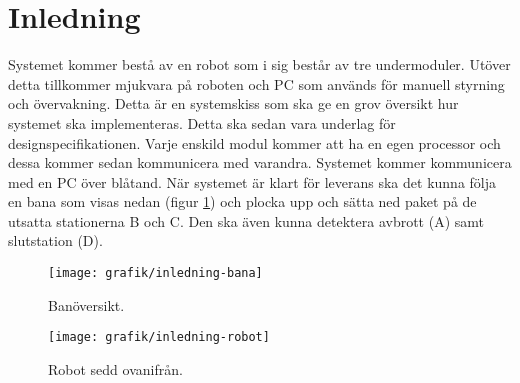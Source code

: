 \section{Inledning}
Systemet kommer bestå av en robot som i sig består av tre undermoduler. Utöver detta tillkommer mjukvara på roboten och PC som används för manuell styrning och övervakning. Detta är en systemskiss som ska ge en grov översikt hur systemet ska implementeras. Detta ska sedan vara underlag för designspecifikationen.
\newline
\newline
Varje enskild modul kommer att ha en egen processor och dessa kommer sedan kommunicera med varandra. Systemet kommer kommunicera med en PC över blåtand. När systemet är klart för leverans ska det kunna följa en bana som visas nedan (figur \ref{systemskiss:banoversikt}) och plocka upp och sätta ned paket på de utsatta stationerna B och C. Den ska även kunna detektera avbrott (A) samt slutstation (D).

\begin{figure}[h]
\center
\texttt{[image: grafik/inledning-bana]}
\caption{Banöversikt.} \label{systemskiss:banoversikt}
\end{figure}

\begin{figure}[h]
\center
\texttt{[image: grafik/inledning-robot]}
\caption{Robot sedd ovanifrån.}
\end{figure}

